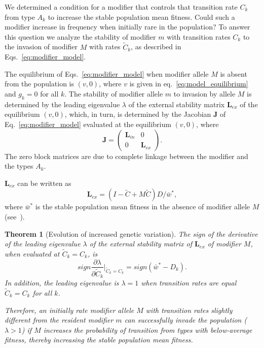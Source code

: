 \documentclass[9pt, a4paper, twocolumn]{extarticle}
\newtheorem{theorem}{Theorem}
\newcommand{\cl}{\mathbf{L}}
\newcommand{\cj}{\mathbf{J}}
\begin{document}

We determined a condition for a modifier that controls that transition rate $C_k$ from type $A_k$ to increase the stable population mean fitness.
Could such a modifier increase in frequency when initially rare in the population?
To answer this question we analyze the stability of modifier $m$ with transition rates $C_k$ to the invasion of modifier $M$ with rates $\tilde{C}_k$, as described in Eqs.~\ref{eq:modifier_model}.

The equilibrium of Eqs.~\ref{eq:modifier_model} when modifier allele $M$ is absent from the population is $(v, 0)$, where $v$ is given in eq.~\ref{eq:model_equilibrium} and $g_k=0$ for all $k$. 
The stability of modifier allele $m$ to invasion by allele $M$ is determined by the leading eigenvalue $\lambda$ of the external stability matrix $\cl_{ex}$ of the equilibrium $(v,0)$, which, in turn, is determined by the Jacobian $\cj$ of Eq.~\ref{eq:modifier_model} evaluated at the equilibrium $(v,0)$, where
\begin{equation}
\cj = \begin{pmatrix}\cl_{in} & 0 \\ 0 & \cl_{ex} \end{pmatrix}.
\end{equation}
The zero block matrices are due to complete linkage between the modifier and the types $A_k$.

$\cl_{ex}$ can be written as
\begin{equation}\label{eq:Lex}
\cl_{ex} = (I - \tilde{C} + M \tilde{C}) D /\bar{w}^*,
\end{equation}
where $\bar{w}^*$ is the stable population mean fitness in the absence of modifier allele $M$ (see~). 

\begin{theorem}[Evolution of increased genetic variation]
The sign of the derivative of the leading eigenvalue $\lambda$ of the external stability matrix of $\cl_{ex}$ of modifier $M$, when evaluated at $\tilde{C}_k=C_k$, is
\begin{equation}
sign \frac{\partial \lambda}{\partial \tilde{C}_k}\bigg\rvert_{\tilde{C}_k = C_k} = 
sign(\bar{w}^* - D_k).
\end{equation}
In addition, the leading eigenvalue is $\lambda=1$ when transition rates are equal $\tilde{C}_k=C_k$ for all $k$.

Therefore, an initially rate modifier allele $M$ with transition rates slightly different from the resident modifier $m$ can successfully invade the population ($\lambda>1$) if $M$ increases the probability of transition from types with below-average fitness, thereby increasing the stable population mean fitness.
\end{theorem}
\end{document}
